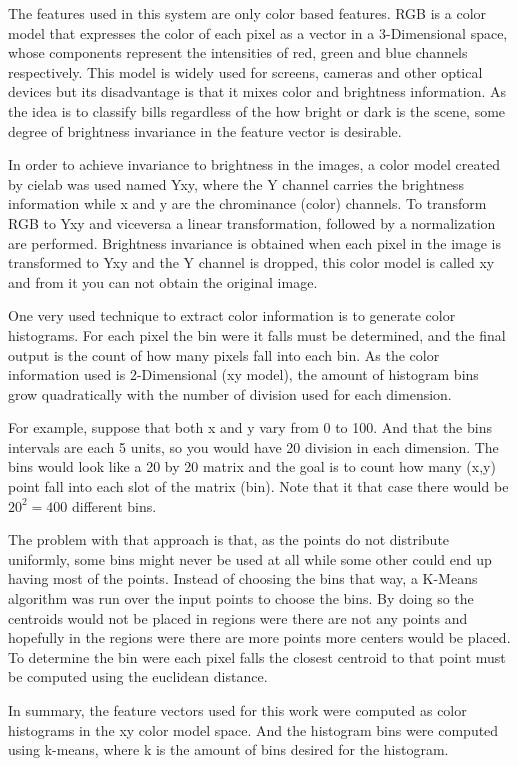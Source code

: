 \documentclass{IEEEtran}
\begin{document}
The features used in this system are only color based features. RGB is a color model that expresses the color of
each pixel as a vector in a 3-Dimensional space, whose components represent the intensities of red, green and blue
channels respectively. This model is widely used for screens, cameras and other optical devices but its disadvantage is 
that it mixes color and brightness information. As the idea is to classify bills regardless of the how bright or 
dark is the scene, some degree of brightness invariance in the feature vector is desirable.

In order to achieve invariance to brightness in the images, a color model created by cielab was used %
named Yxy, where the Y channel carries the brightness information while x and y are the chrominance (color) 
channels. To transform RGB to Yxy and viceversa a linear transformation, followed by a normalization are
performed. Brightness invariance is obtained when each pixel in the image is transformed to Yxy and the
Y channel is dropped, this color model is called xy and from it you can not obtain the original image.

One very used technique to extract color information is to generate color histograms. For each pixel
the bin were it falls must be determined, and the final output is the count of how many pixels fall
into each bin. As the color information used is 2-Dimensional (xy model), the amount of histogram
bins grow quadratically with the number of division used for each dimension. 

For example, suppose that both x and y vary from 0 to 100. And that the bins intervals are each 5
units, so you would have 20 division in each dimension. The bins would look like a 20 by 20 matrix
and the goal is to count how many (x,y) point fall into each slot of the matrix (bin). Note that
it that case there would be $20^2=400$ different bins.

The problem with that approach is that, as the points do not distribute uniformly, some bins might
never be used at all while some other could end up having most of the points. Instead of choosing the
bins that way, a K-Means algorithm was run over the input points to choose the bins. By doing so
the centroids would not be placed in regions were there are not any points and hopefully in the
regions were there are more points more centers would be placed. To determine the bin were each pixel
falls the closest centroid to that point must be computed using the euclidean distance.

In summary, the feature vectors used for this work were computed as color histograms in the
xy color model space. And the histogram bins were computed using k-means, where k is the
amount of bins desired for the histogram.
\end{document}
